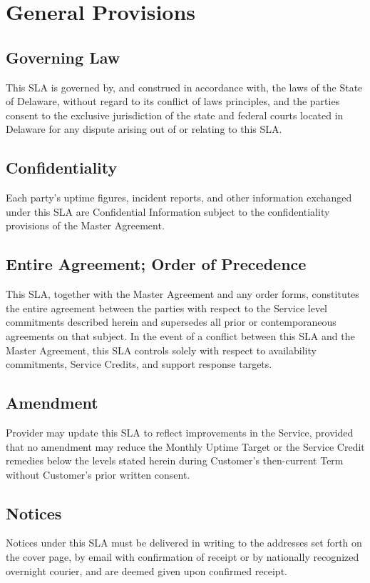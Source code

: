 \section{General Provisions}
\label{sec:general}

\subsection{Governing Law}
\label{sec:governing-law}
This SLA is governed by, and construed in accordance with, the laws of the State of Delaware, without regard to its conflict of laws principles, and the parties consent to the exclusive jurisdiction of the state and federal courts located in Delaware for any dispute arising out of or relating to this SLA.

\subsection{Confidentiality}
\label{sec:confidentiality}
Each party's uptime figures, incident reports, and other information exchanged under this SLA are Confidential Information subject to the confidentiality provisions of the Master Agreement.

\subsection{Entire Agreement; Order of Precedence}
This SLA, together with the Master Agreement and any order forms, constitutes the entire agreement between the parties with respect to the Service level commitments described herein and supersedes all prior or contemporaneous agreements on that subject. In the event of a conflict between this SLA and the Master Agreement, this SLA controls solely with respect to availability commitments, Service Credits, and support response targets.

\subsection{Amendment}
Provider may update this SLA to reflect improvements in the Service, provided that no amendment may reduce the Monthly Uptime Target or the Service Credit remedies below the levels stated herein during Customer's then-current Term without Customer's prior written consent.

\subsection{Notices}
Notices under this SLA must be delivered in writing to the addresses set forth on the cover page, by email with confirmation of receipt or by nationally recognized overnight courier, and are deemed given upon confirmed receipt.

